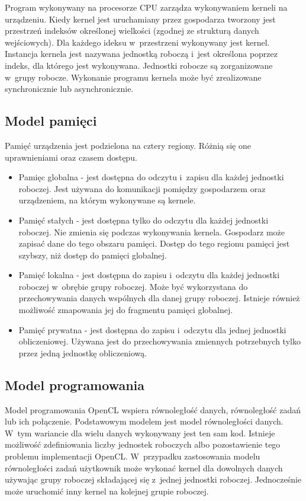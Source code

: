 Program wykonywany na procesorze CPU zarządza wykonywaniem kerneli na urządzeniu. Kiedy kernel jest uruchamiany przez gospodarza tworzony jest przestrzeń indeksów określonej wielkości (zgodnej ze strukturą danych wejściowych). Dla każdego ideksu w~przestrzeni wykonywany jest kernel. Instancja kernela jest nazywana jednostką roboczą i~jest określona poprzez indeks, dla którego jest wykonywana. Jednostki robocze są zorganizowane w~grupy robocze. Wykonanie programu kernela może być zrealizowane synchronicznie lub asynchronicznie.

\subsection{Model pamięci}
\label{memoryModel}

Pamięć urządzenia jest podzielona na cztery regiony. Różnią się one uprawnieniami oraz czasem dostępu.
\begin{itemize}
\item Pamięc globalna - jest dostępna do odczytu i~zapisu dla każdej jednostki roboczej. Jest używana do komunikacji pomiędzy gospodarzem oraz urządzeniem, na którym wykonywane są kernele.
\item Pamięć stałych - jest dostępna tylko do odczytu dla każdej jednostki roboczej. Nie zmienia się podczas wykonywania kernela. Gospodarz może zapisać dane do tego obszaru pamięci. Dostęp do tego regionu pamięci jest szybszy, niż dostęp do pamięci globalnej.
\item Pamięć lokalna - jest dostępna do zapisu i~odczytu dla każdej jednostki roboczej w~obrębie grupy roboczej. Może być wykorzystana do przechowywania danych wspólnych dla danej grupy roboczej. Istnieje również możliwość zmapowania jej do fragmentu pamięci globalnej.
\item Pamięć prywatna - jest dostępna do zapisu i~odczytu dla jednej jednostki obliczeniowej. Używana jest do przechowywania zmiennych potrzebnych tylko przez jedną jednostkę obliczeniową.
\end{itemize}

\subsection{Model programowania}
\label{programmingModel}

Model programowania OpenCL wspiera równoległość danych, równoległość zadań lub ich połączenie. Podstawowym modelem jest model równoległości danych. W~tym wariancie dla wielu danych wykonywany jest ten sam kod. Istnieje możliwość zdefiniowania liczby jednostek roboczych albo pozostawienie tego problemu implementacji OpenCL. W~przypadku zastosowania modelu równoległości zadań użytkownik może wykonać kernel dla dowolnych danych używając grupy roboczej składającej się z~jednej jednostki roboczej. Jednocześnie może uruchomić inny kernel na kolejnej grupie roboczej.

